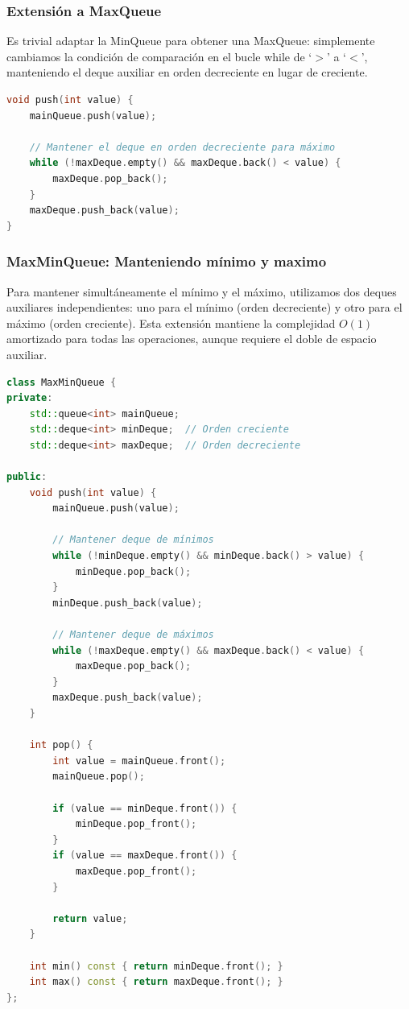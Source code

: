 \documentclass[12pt,a4paper]{article}
\begin{document}
\subsubsection{Extensión a MaxQueue}

Es trivial adaptar la MinQueue para obtener una MaxQueue: simplemente cambiamos la condición de comparación en el bucle while de `$>$' a `$<$', manteniendo el deque auxiliar en orden decreciente en lugar de creciente.

\begin{lstlisting}[language=C++, label=lst:maxqueue_simple, caption={MaxMinQueue.hpp - Adaptación de MinQueue para MaxQueue}]
void push(int value) {
    mainQueue.push(value);
    
    // Mantener el deque en orden decreciente para máximo
    while (!maxDeque.empty() && maxDeque.back() < value) {
        maxDeque.pop_back();
    }
    maxDeque.push_back(value);
}
\end{lstlisting}

\subsubsection{MaxMinQueue: Manteniendo mínimo y maximo}

Para mantener simultáneamente el mínimo y el máximo, utilizamos dos deques auxiliares independientes: uno para el mínimo (orden decreciente) y otro para el máximo (orden creciente). Esta extensión mantiene la complejidad $O(1)$ amortizado para todas las operaciones, aunque requiere el doble de espacio auxiliar.

\begin{lstlisting}[language=C++, label=lst:maxminqueue_simple, caption={MaxMinQueue.hpp - Implementación completa de MaxMinQueue con dos deques auxiliares}]
class MaxMinQueue {
private:
    std::queue<int> mainQueue;
    std::deque<int> minDeque;  // Orden creciente
    std::deque<int> maxDeque;  // Orden decreciente

public:
    void push(int value) {
        mainQueue.push(value);
        
        // Mantener deque de mínimos
        while (!minDeque.empty() && minDeque.back() > value) {
            minDeque.pop_back();
        }
        minDeque.push_back(value);
        
        // Mantener deque de máximos
        while (!maxDeque.empty() && maxDeque.back() < value) {
            maxDeque.pop_back();
        }
        maxDeque.push_back(value);
    }
    
    int pop() {
        int value = mainQueue.front();
        mainQueue.pop();
        
        if (value == minDeque.front()) {
            minDeque.pop_front();
        }
        if (value == maxDeque.front()) {
            maxDeque.pop_front();
        }
        
        return value;
    }
    
    int min() const { return minDeque.front(); }
    int max() const { return maxDeque.front(); }
};
\end{lstlisting}
\end{document}
